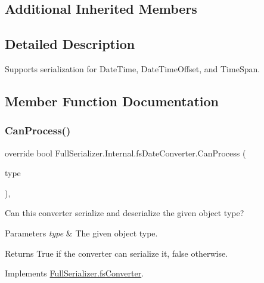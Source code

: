 \subsection*{Additional Inherited Members}


\subsection{Detailed Description}
Supports serialization for Date\+Time, Date\+Time\+Offset, and Time\+Span. 



\subsection{Member Function Documentation}
\mbox{\label{class_full_serializer_1_1_internal_1_1fs_date_converter_a4728edb68d03760970cb536f9c376cc0}} 
\subsubsection{\texorpdfstring{Can\+Process()}{CanProcess()}}
{\footnotesize\ttfamily override bool Full\+Serializer.\+Internal.\+fs\+Date\+Converter.\+Can\+Process (\begin{DoxyParamCaption}\item[{Type}]{type }\end{DoxyParamCaption})\hspace{0.3cm}{\ttfamily [inline]}, {\ttfamily [virtual]}}



Can this converter serialize and deserialize the given object type? 


\begin{DoxyParams}{Parameters}
{\em type} & The given object type.\\
\hline
\end{DoxyParams}
\begin{DoxyReturn}{Returns}
True if the converter can serialize it, false otherwise.
\end{DoxyReturn}


Implements \hyperlink{class_full_serializer_1_1fs_converter_a6d9e084c5e7f646a8d220705efaecb35}{Full\+Serializer.\+fs\+Converter}.

